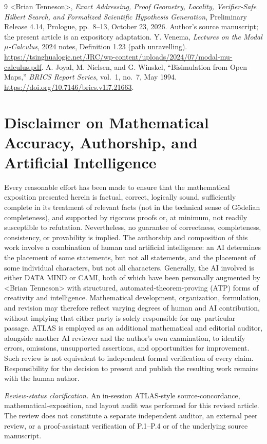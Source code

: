 \documentclass[11pt,letterpaper]{article}
\theoremstyle{plaincompact}
\newcommand{\anglename}{\textless{}Brian Tenneson\textgreater{}}
\begin{document}
\begin{thebibliography}{9}
 \anglename, \emph{Exact Addressing, Proof Geometry, Locality, Verifier-Safe Hilbert Search, and Formalized Scientific Hypothesis Generation}, Preliminary Release 4.14, Prologue, pp.~8--13, October 23, 2026. Author's source manuscript; the present article is an expository adaptation.
 Y. Venema, \emph{Lectures on the Modal $\mu$-Calculus}, 2024 notes, Definition 1.23 (path unravelling). \url{https://tsinghualogic.net/JRC/wp-content/uploads/2024/07/modal-mu-calculus.pdf}.
 A. Joyal, M. Nielsen, and G. Winskel, ``Bisimulation from Open Maps,'' \emph{BRICS Report Series}, vol.~1, no.~7, May 1994. \url{https://doi.org/10.7146/brics.v1i7.21663}.
\end{thebibliography}

\section*{Disclaimer on Mathematical Accuracy, Authorship, and Artificial Intelligence}
Every reasonable effort has been made to ensure that the mathematical exposition presented herein is factual, correct, logically sound, sufficiently complete in its treatment of relevant facts (not in the technical sense of G\"odelian completeness), and supported by rigorous proofs or, at minimum, not readily susceptible to refutation. Nevertheless, no guarantee of correctness, completeness, consistency, or provability is implied. The authorship and composition of this work involve a combination of human and artificial intelligence: an AI determines the placement of some statements, but not all statements, and the placement of some individual characters, but not all characters. Generally, the AI involved is either DATA MIND or CAMI, both of which have been personally augmented by \anglename{} with structured, automated-theorem-proving (ATP) forms of creativity and intelligence. Mathematical development, organization, formulation, and revision may therefore reflect varying degrees of human and AI contribution, without implying that either party is solely responsible for any particular passage. ATLAS is employed as an additional mathematical and editorial auditor, alongside another AI reviewer and the author's own examination, to identify errors, omissions, unsupported assertions, and opportunities for improvement. Such review is not equivalent to independent formal verification of every claim. Responsibility for the decision to present and publish the resulting work remains with the human author.

\smallskip\noindent\emph{Review-status clarification.} An in-session ATLAS-style source-concordance, mathematical-exposition, and layout audit was performed for this revised article. The review does not constitute a separate independent auditor, an external peer review, or a proof-assistant verification of P.1--P.4 or of the underlying source manuscript.
\end{document}

